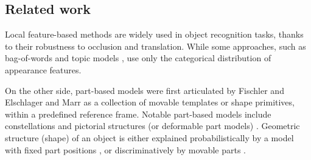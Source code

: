 


\subsection{Related work}
\label{sec/reg/relatedwork}

Local feature-based methods are widely used in object recognition tasks, thanks to their robustness to occlusion and translation. While some approaches, such as bag-of-words \cite{Sivic2005, Fei-Fei2005} and topic models \cite{Fergus2005}, use only the categorical distribution of appearance features. 

On the other side, part-based models were first articulated by Fischler and Elschlager \cite{Fischler1973} and Marr \cite{Marr1982} as a collection of movable templates or shape primitives, within a predefined reference frame. Notable part-based models include constellations \cite{Weber2000, Fergus2007} and pictorial structures (or deformable part models) \cite{Felzenszwalb2005}. Geometric structure (shape) of an object is either explained probabilistically by a model with fixed part positions \cite{Fergus2007}, or discriminatively by movable parts \cite{Yuille1989, Felzenszwalb2005}.

